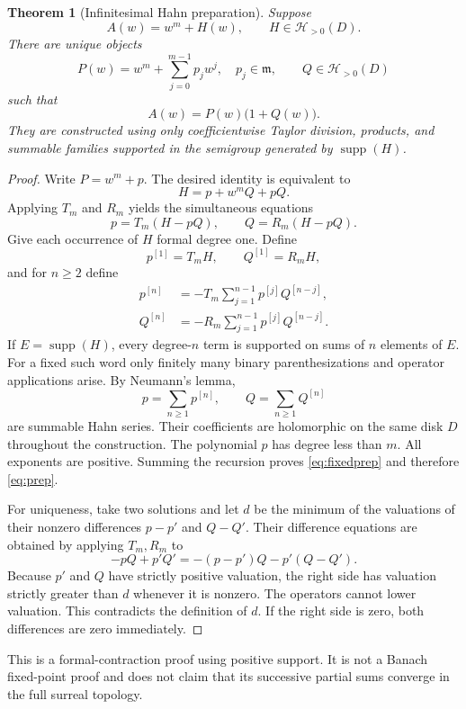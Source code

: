 \documentclass[11pt,oneside]{article}
\numberwithin{equation}{section}
\newtheorem{theorem}{Theorem}[section]
\theoremstyle{definition}
\theoremstyle{remark}\newtheorem{remark}[theorem]{Remark}
\newcommand{\HH}{\mathscr H}
\newcommand{\m}{\mathfrak m}
\newcommand{\supp}{\operatorname{supp}}
\begin{document}
\begin{theorem}[Infinitesimal Hahn preparation]\label{thm:preparation}
Suppose
\[
 A(w)=w^m+H(w),\qquad H\in\HH_{>0}(D).
\]
There are unique objects
\[
 P(w)=w^m+\sum_{j=0}^{m-1}p_jw^j,
 \quad p_j\in\m,\qquad Q\in\HH_{>0}(D)
\]
such that
\begin{equation}\label{eq:prep}
 A(w)=P(w)\bigl(1+Q(w)\bigr).
\end{equation}
They are constructed using only coefficientwise Taylor division, products,
and summable families supported in the semigroup generated by
$\supp(H)$.
\end{theorem}
\begin{proof}
Write $P=w^m+p$. The desired identity is equivalent to
\[
 H=p+w^mQ+pQ.
\]
Applying $T_m$ and $R_m$ yields the simultaneous equations
\begin{equation}\label{eq:fixedprep}
 p=T_m(H-pQ),\qquad Q=R_m(H-pQ).
\end{equation}
Give each occurrence of $H$ formal degree one. Define
\[
 p^{[1]}=T_mH,\qquad Q^{[1]}=R_mH,
\]
and for $n\geq2$ define
\begin{align}\label{eq:preprecursion}
 p^{[n]}&=-T_m\sum_{j=1}^{n-1}p^{[j]}Q^{[n-j]},\\
 Q^{[n]}&=-R_m\sum_{j=1}^{n-1}p^{[j]}Q^{[n-j]}.
\end{align}
If $E=\supp(H)$, every degree-$n$ term is supported on sums of $n$
elements of $E$. For a fixed such word only finitely many binary
parenthesizations and operator applications arise. By Neumann's lemma,
\[
 p=\sum_{n\geq1}p^{[n]},\qquad Q=\sum_{n\geq1}Q^{[n]}
\]
are summable Hahn series. Their coefficients are holomorphic on the same
disk $D$ throughout the construction. The polynomial $p$ has degree less
than $m$. All exponents are positive. Summing the recursion proves
\eqref{eq:fixedprep} and therefore \eqref{eq:prep}.

For uniqueness, take two solutions and let $d$ be the minimum of the
valuations of their nonzero differences $p-p'$ and $Q-Q'$. Their
difference equations are obtained by applying $T_m,R_m$ to
\[
 -pQ+p'Q'=-(p-p')Q-p'(Q-Q').
\]
Because $p'$ and $Q$ have strictly positive valuation, the right side has
valuation strictly greater than $d$ whenever it is nonzero. The operators
cannot lower valuation. This contradicts the definition of $d$. If the
right side is zero, both differences are zero immediately.
\end{proof}
This is a formal-contraction proof using positive support. It is not a
Banach fixed-point proof and does not claim that its successive partial
sums converge in the full surreal topology.
\end{document}
